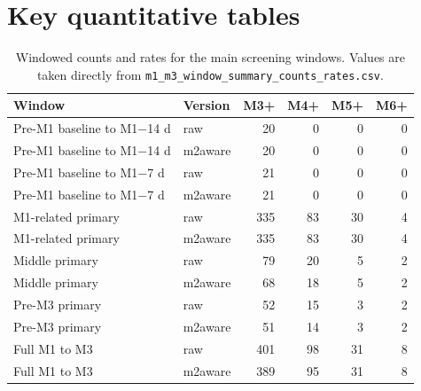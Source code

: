 \documentclass[11pt]{article}
\begin{document}
\section{Key quantitative tables}
\begin{table}[H]
\centering
\caption{Windowed counts and rates for the main screening windows. Values are taken directly from \texttt{m1\_m3\_window\_summary\_counts\_rates.csv}.}
\label{tab:counts}
\small
\begin{tabular}{llrrrr}
\toprule
Window & Version & M3+ & M4+ & M5+ & M6+ \\
\midrule
Pre-M1 baseline to M1$-$14 d & raw & 20 & 0 & 0 & 0 \\
Pre-M1 baseline to M1$-$14 d & m2aware & 20 & 0 & 0 & 0 \\
Pre-M1 baseline to M1$-$7 d & raw & 21 & 0 & 0 & 0 \\
Pre-M1 baseline to M1$-$7 d & m2aware & 21 & 0 & 0 & 0 \\
M1-related primary & raw & 335 & 83 & 30 & 4 \\
M1-related primary & m2aware & 335 & 83 & 30 & 4 \\
Middle primary & raw & 79 & 20 & 5 & 2 \\
Middle primary & m2aware & 68 & 18 & 5 & 2 \\
Pre-M3 primary & raw & 52 & 15 & 3 & 2 \\
Pre-M3 primary & m2aware & 51 & 14 & 3 & 2 \\
Full M1 to M3 & raw & 401 & 98 & 31 & 8 \\
Full M1 to M3 & m2aware & 389 & 95 & 31 & 8 \\
\bottomrule
\end{tabular}
\end{table}
\end{document}
